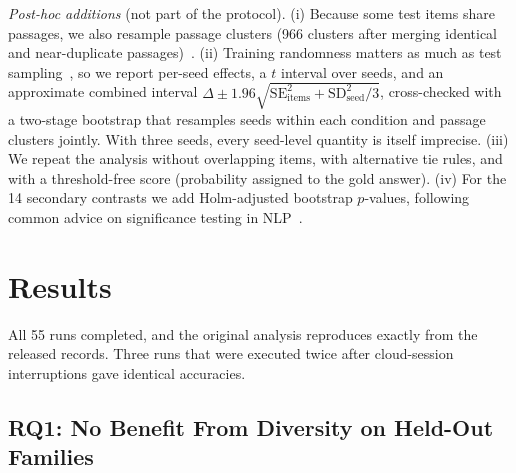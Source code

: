 \documentclass[conference]{IEEEtran}
\begin{document}
\textit{Post-hoc additions} (not part of the protocol). (i) Because some test items share passages, we also resample passage clusters (966 clusters after merging identical and near-duplicate passages)~\cite{field2007bootstrapping}. (ii) Training randomness matters as much as test sampling~\cite{dodge2020fine,bouthillier2021accounting}, so we report per-seed effects, a $t$ interval over seeds, and an approximate combined interval $\Delta \pm 1.96\sqrt{\mathrm{SE}^2_{\text{items}} + \mathrm{SD}^2_{\text{seed}}/3}$, cross-checked with a two-stage bootstrap that resamples seeds within each condition and passage clusters jointly. With three seeds, every seed-level quantity is itself imprecise. (iii) We repeat the analysis without overlapping items, with alternative tie rules, and with a threshold-free score (probability assigned to the gold answer). (iv) For the 14 secondary contrasts we add Holm-adjusted bootstrap $p$-values, following common advice on significance testing in NLP~\cite{dror2018hitchhiker}.

\section{Results}
\label{sec:results}

All 55 runs completed, and the original analysis reproduces exactly from the released records. Three runs that were executed twice after cloud-session interruptions gave identical accuracies.

\subsection{RQ1: No Benefit From Diversity on Held-Out Families}
\label{sec:primary}
\end{document}
